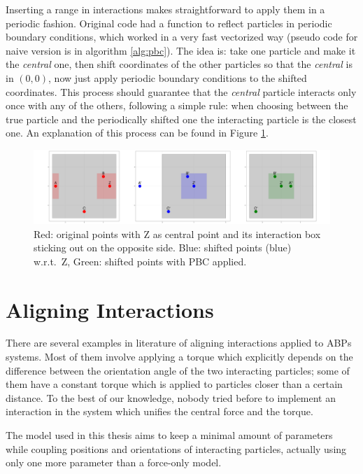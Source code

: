 \documentclass[../../master_thesis_np.tex]{subfiles}
\begin{document}
	Inserting a range in interactions makes straightforward to apply them in a periodic fashion. Original code had a function to reflect particles in periodic boundary conditions, which worked in a very fast vectorized way (pseudo code for naive version is in algorithm \ref{alg:pbc}). The idea is: take one particle and make it the \emph{central} one, then shift coordinates of the other particles so that the \emph{central} is in $(0,0)$, now just apply periodic boundary conditions to the shifted coordinates. This process should guarantee that the \emph{central} particle interacts only once with any of the others, following a simple rule: when choosing between the true particle and the periodically shifted one the interacting particle is the closest one. An explanation of this process can be found in Figure \ref{fig:periodicint}.
	
	\begin{figure}[htp]
		\centering
		\includegraphics[width=\textwidth]{periodic_interaction.png}
		\caption{Red: original points with Z as central point and its interaction box sticking out on the opposite side. Blue: shifted points (blue) w.r.t.\ Z, Green: shifted points with PBC applied.}
		\label{fig:periodicint}
	\end{figure}
	
	\section{Aligning Interactions} \label{alignint}

	There are several examples in literature of aligning interactions applied to ABPs systems. Most of them involve applying a torque which explicitly depends on the difference between the orientation angle of the two interacting particles; some of them have a constant torque which is applied to particles closer than a certain distance. To the best of our knowledge, nobody tried before to implement an interaction in the system which unifies the central force and the torque. 
	
	The model used in this thesis aims to keep a minimal amount of parameters while coupling positions and orientations of interacting particles, actually using only one more parameter than a force-only model.
	
\end{document}
